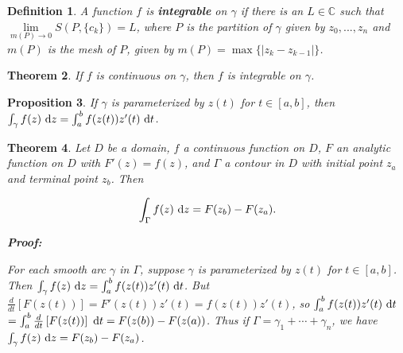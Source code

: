 \documentclass{article}
\theoremstyle{colontheorem}
\newtheorem{theorem}{Theorem}[section]
\newtheorem{proposition}[theorem]{Proposition}
\newtheorem{definition}[theorem]{Definition}
\newenvironment{Theorem}
{
	\begin{mdframed}[backgroundcolor=TheoremOrange!10]
	\begin{theorem}
}
{
	\end{theorem}
	\end{mdframed}
	
	\vspace{.15in}
}
\newenvironment{Proposition}
{
	\begin{mdframed}[backgroundcolor=TheoremOrange!10]
	\begin{proposition}
}
{
	\end{proposition}
	\end{mdframed}
	
	\vspace{.15in}
}
\newenvironment{Def}
{
	\begin{mdframed}[backgroundcolor=DefGreen!10]
	\begin{definition}
}
{
	\end{definition}
	\end{mdframed}
	
	\vspace{.15in}
}
\newenvironment{Proof}
{
	\begin{mdframed}[backgroundcolor=ProofPurple!10]
	\textbf{Proof:}%
}
{
	\end{mdframed}
	
	\vspace{.085in}
}
\begin{document}
\begin{Def}
	
	A function $f$ is \textbf{integrable} on $\gamma$ if there is an $L \in \mathbb{C}$ such that $\lim\limits_{m(P) \to 0} S(P, \{c_k\}) = L$, where $P$ is the partition of $\gamma$ given by $z_0, ..., z_n$ and $m(P)$ is the mesh of $P$, given by $m(P) = \max \{ |z_k - z_{k-1} |\}$.
	
\end{Def}



\begin{Theorem}
	
	If $f$ is continuous on $\gamma$, then $f$ is integrable on $\gamma$.
	
\end{Theorem}



\begin{Proposition}
	
	If $\gamma$ is parameterized by $z(t)$ for $t \in [a, b]$, then $\int_\gamma f(z)\ \textnormal{d}z = \int_a^b f(z(t)) z'(t)\ \textnormal{d}t$.
	
\end{Proposition}



\begin{Theorem}
	
	Let $D$ be a domain, $f$ a continuous function on $D$, $F$ an analytic function on $D$ with $F'(z) = f(z)$, and $\Gamma$ a contour in $D$ with initial point $z_a$ and terminal point $z_b$. Then
	
	$$
		\int_\Gamma f(z)\ \textnormal{d}z = F(z_b) - F(z_a).
	$$
	
	\pagebreak
	
	\begin{Proof}
		For each smooth arc $\gamma$ in $\Gamma$, suppose $\gamma$ is parameterized by $z(t)$ for $t \in [a, b]$. Then $\int_\gamma f(z)\ \textnormal{d}z = \int_a^b f(z(t)) z'(t)\ \textnormal{d}t$. But $\frac{d}{dt} \left[ F(z(t)) \right] = F'(z(t)) z'(t) = f(z(t)) z'(t)$, so $\int_a^b f(z(t)) z'(t)\ \textnormal{d}t$ $= \int_a^b \frac{d}{dt} \left[ F(z(t)) \right]\ \textnormal{d}t = F(z(b)) - F(z(a))$. Thus if $\Gamma = \gamma_1 + \cdots + \gamma_n$, we have $\int_\gamma f(z)\ \textnormal{d}z = F(z_b) - F(z_a)$.
		
	\end{Proof}
	
\end{Theorem}
\end{document}
